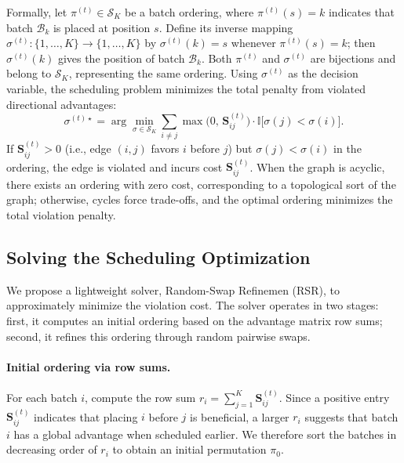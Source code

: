 Formally, let $\pi^{(t)} \in \mathcal{S}_K$ be a batch ordering, where $\pi^{(t)}(s)=k$ indicates that batch $\mathcal{B}_k$ is placed at position $s$. 
Define its inverse mapping $\sigma^{(t)}: \{1,\dots,K\} \to \{1,\dots,K\}$ by $\sigma^{(t)}(k)=s$ whenever $\pi^{(t)}(s)=k$; then $\sigma^{(t)}(k)$ gives the position of batch $\mathcal{B}_k$.
Both $\pi^{(t)}$ and $\sigma^{(t)}$ are bijections and belong to $\mathcal{S}_K$, representing the same ordering. Using $\sigma^{(t)}$ as the decision variable, the scheduling problem minimizes the total penalty from violated directional advantages:
{
\setlength{\abovedisplayskip}{8pt}
\setlength{\belowdisplayskip}{8pt}
\[
\sigma^{(t)\star} = \arg\min_{\sigma \in \mathcal{S}_K} \sum_{i \ne j} \max\!\bigl(0, \,\mathbf{S}^{(t)}_{ij}\bigr) \cdot \mathbb{I}\bigl[\sigma(j) < \sigma(i)\bigr].
\]
}
If $\mathbf{S}^{(t)}_{ij} > 0$ (i.e., edge $(i,j)$ favors $i$ before $j$) but $\sigma(j) < \sigma(i)$ in the ordering, the edge is violated and incurs cost $\mathbf{S}^{(t)}_{ij}$.
When the graph is acyclic, there exists an ordering with zero cost, corresponding to a topological sort of the graph; otherwise, cycles force trade-offs, and the optimal ordering minimizes the total violation penalty.


\subsection{Solving the Scheduling Optimization}
\label{subsec:solver}

We propose a lightweight solver, Random-Swap Refinemen (RSR), to approximately minimize the violation cost. 
The solver operates in two stages: first, it computes an initial ordering based on the advantage matrix row sums; second, it refines this ordering through random pairwise swaps.

\paragraph{Initial ordering via row sums.}
For each batch $i$, compute the row sum $r_i = \sum_{j=1}^K \mathbf{S}^{(t)}_{ij}$. 
Since a positive entry $\mathbf{S}^{(t)}_{ij}$ indicates that placing $i$ before $j$ is beneficial, a larger $r_i$ suggests that batch $i$ has a global advantage when scheduled earlier. 
We therefore sort the batches in decreasing order of $r_i$ to obtain an initial permutation $\pi_0$.


